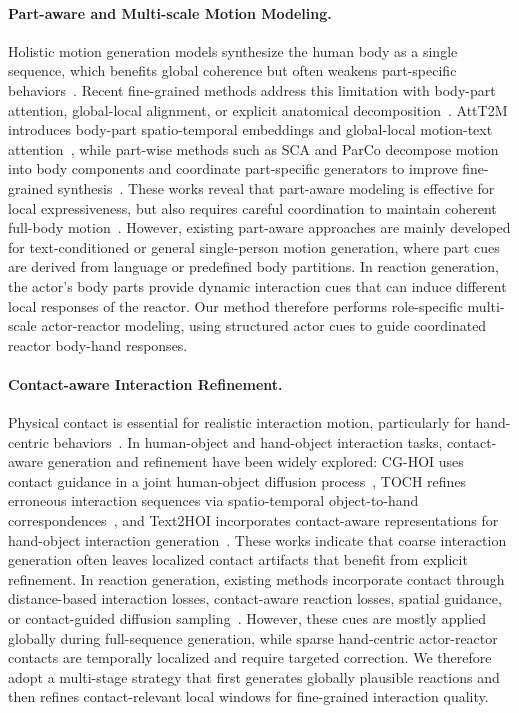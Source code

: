 \documentclass{article}
\begin{document}
\paragraph{Part-aware and Multi-scale Motion Modeling.}
Holistic motion generation models synthesize the human body as a single sequence, which benefits global coherence but often weakens part-specific behaviors~\citep{zou2024parco,heo2026party}. Recent fine-grained methods address this limitation with body-part attention, global-local alignment, or explicit anatomical decomposition~\citep{zhong2023attt2m,ghosh2021synthesis,zou2024parco,heo2026party}. AttT2M introduces body-part spatio-temporal embeddings and global-local motion-text attention~\citep{zhong2023attt2m}, while part-wise methods such as SCA and ParCo decompose motion into body components and coordinate part-specific generators to improve fine-grained synthesis~\citep{ghosh2021synthesis,zou2024parco}. These works reveal that part-aware modeling is effective for local expressiveness, but also requires careful coordination to maintain coherent full-body motion~\citep{zou2024parco,heo2026party}. However, existing part-aware approaches are mainly developed for text-conditioned or general single-person motion generation, where part cues are derived from language or predefined body partitions. In reaction generation, the actor's body parts provide dynamic interaction cues that can induce different local responses of the reactor. Our method therefore performs role-specific multi-scale actor-reactor modeling, using structured actor cues to guide coordinated reactor body-hand responses.

\paragraph{Contact-aware Interaction Refinement.}
Physical contact is essential for realistic interaction motion, particularly for hand-centric behaviors~\citep{ghosh2024remos,zhang2025reactffusion}. In human-object and hand-object interaction tasks, contact-aware generation and refinement have been widely explored: CG-HOI uses contact guidance in a joint human-object diffusion process~\citep{diller2024cg}, TOCH refines erroneous interaction sequences via spatio-temporal object-to-hand correspondences~\citep{zhou2022toch}, and Text2HOI incorporates contact-aware representations for hand-object interaction generation~\citep{cha2024text2hoi}. These works indicate that coarse interaction generation often leaves localized contact artifacts that benefit from explicit refinement. In reaction generation, existing methods incorporate contact through distance-based interaction losses, contact-aware reaction losses, spatial guidance, or contact-guided diffusion sampling~\citep{xu2024regennet,ghosh2024remos,zhang2025reactffusion}. However, these cues are mostly applied globally during full-sequence generation, while sparse hand-centric actor-reactor contacts are temporally localized and require targeted correction. We therefore adopt a multi-stage strategy that first generates globally plausible reactions and then refines contact-relevant local windows for fine-grained interaction quality.
\end{document}
